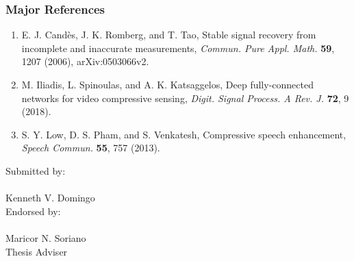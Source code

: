 \documentclass[10pt,oneside]{article}
\begin{document}
\subsubsection*{Major References}
\begin{enumerate}
	\item E. J. Cand\`{e}s, J. K. Romberg, and T. Tao, Stable signal recovery from incomplete and inaccurate measurements, \textit{Commun. Pure Appl. Math.} \textbf{59}, 1207 (2006), arXiv:0503066v2.
	\item M. Iliadis, L. Spinoulas, and A. K. Katsaggelos, Deep fully-connected networks for video compressive sensing, \textit{Digit. Signal Process. A Rev. J.} \textbf{72}, 9 (2018).
	\item S. Y. Low, D. S. Pham, and S. Venkatesh, Compressive speech enhancement, \textit{Speech Commun.} \textbf{55}, 757 (2013).
\end{enumerate}

\medskip

Submitted by: \\
\smallskip \\
Kenneth V. Domingo \\

Endorsed by: \\
\smallskip \\
Maricor N. Soriano \\
Thesis Adviser
\end{document}
